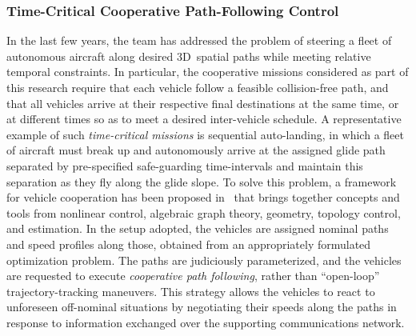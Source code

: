 \documentclass[letter,onecolumn,12pt]{aiaa-tc}
\newcommand{\1}{1_n}
\begin{document}
\subsubsection{Time-Critical Cooperative Path-Following Control}
\label{subsec:time_crit_CPF}
In the last few years, the team has addressed the problem of steering a fleet of autonomous aircraft along desired 3D~spatial paths while meeting relative temporal constraints. In particular, the cooperative missions considered as part of this research require that each vehicle follow a feasible collision-free path, and that all vehicles arrive at their respective final destinations at the same time, or at different times so as to meet a desired inter-vehicle schedule. A representative example of such \emph{time-critical missions} is sequential auto-landing, in which a fleet of aircraft must break up and autonomously arrive at the assigned glide path separated by pre-specified safe-guarding time-intervals and maintain this separation as they fly along the glide slope. To solve this problem, a framework for vehicle cooperation has been proposed in~\cite{JGCD13_CPF,XargayPhd} that brings together concepts and tools from nonlinear control, algebraic graph theory, geometry, topology control, and estimation. In the setup adopted, the vehicles are assigned nominal paths and speed profiles along those, obtained from an appropriately formulated optimization problem. The paths are judiciously parameterized, and the vehicles are requested to execute \emph{cooperative path following}, rather than ``open-loop'' trajectory-tracking maneuvers. This strategy allows the vehicles to react to unforeseen off-nominal situations by negotiating their speeds along the paths in response to information exchanged over the supporting communications network.
\end{document}
